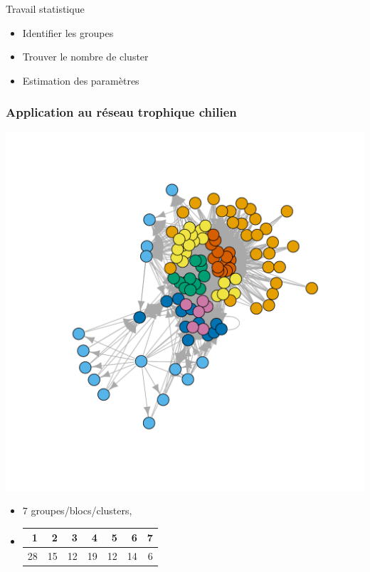 \documentclass[nopagenumber,9pt]{beamer}
\begin{document}
\begin{frame}
\begin{block}{Travail statistique}
\begin{itemize}
\item Identifier les groupes
\item Trouver le nombre de cluster
\item Estimation des paramètres
\end{itemize}
\end{block}

\end{frame}



\begin{frame}
 \frametitle{Application au réseau trophique chilien }
 
 \begin{center}
  \includegraphics[scale=.3]{plots/chilean_sbm.pdf}
 \end{center}

 \begin{itemize}
 \item $7$ groupes/blocs/clusters,
 \item \begin{tabular}{rrrrrrr}
  \hline
  1 & 2 & 3 & 4 & 5 & 6 & 7 \\ 
  \hline
  28 &  15 &  12 &  19 &  12 &  14 &   6 \\ 
   \hline
\end{tabular}
\end{itemize}


\end{frame}
\end{document}
